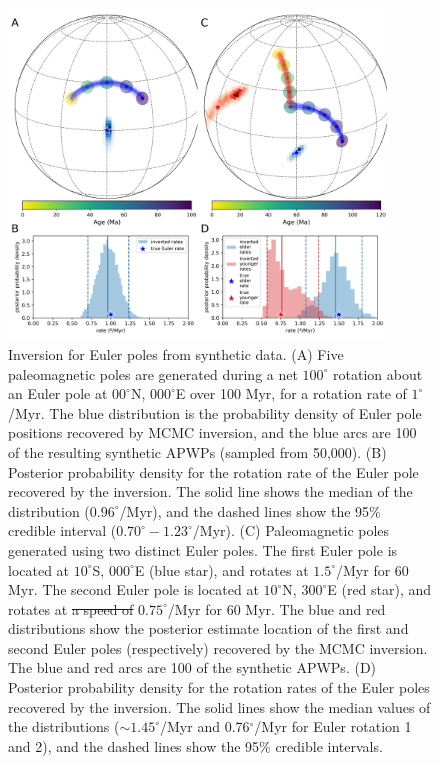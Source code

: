 \documentclass[11pt,letterpaper]{article}
\providecommand{\DIFdeltex}[1]{{\protect\color{red}\sout{#1}}}                      %
\providecommand{\DIFdelFL}[1]{\DIFdel{#1}} %
\providecommand{\DIFdelbeginFL}{} %
\providecommand{\DIFdelendFL}{} %
\providecommand{\DIFdel}[1]{\texorpdfstring{\DIFdeltex{#1}}{}} %
\newcommand{\DIFscaledelfig}{0.5}
\newlength{\DIFdelgraphicswidth} %
\newlength{\DIFdelgraphicsheight} %
\newcommand{\DIFdelincludegraphics}[2][]{%
\sbox{\DIFdelgraphicsbox}{\DIFOincludegraphics[#1]{#2}}%
\settoboxwidth{\DIFdelgraphicswidth}{\DIFdelgraphicsbox} %
\settoboxtotalheight{\DIFdelgraphicsheight}{\DIFdelgraphicsbox} %
\scalebox{\DIFscaledelfig}{%
\parbox[b]{\DIFdelgraphicswidth}{\usebox{\DIFdelgraphicsbox}\\[-\baselineskip] \rule{\DIFdelgraphicswidth}{0em}}\llap{\resizebox{\DIFdelgraphicswidth}{\DIFdelgraphicsheight}{%
\setlength{\unitlength}{\DIFdelgraphicswidth}%
\begin{picture}(1,1)%
\thicklines\linethickness{2pt} %
{\color[rgb]{1,0,0}\put(0,0){\framebox(1,1){}}}%
{\color[rgb]{1,0,0}\put(0,0){\line( 1,1){1}}}%
{\color[rgb]{1,0,0}\put(0,1){\line(1,-1){1}}}%
\end{picture}%
}\hspace*{3pt}}} %
} %
\DeclareRobustCommand{\DIFdelbeginFL}{\DIFOdelbeginFL \let\includegraphics\DIFdelincludegraphics} %
\DeclareRobustCommand{\DIFdelendFL}{\DIFOaddendFL \let\includegraphics\DIFOincludegraphics} %
\begin{document}
\begin{figure}
\centering
\includegraphics[width=0.9\textwidth]{fig_synthetic_pep.png}
\caption{Inversion for Euler poles from synthetic data. (A) Five paleomagnetic poles are generated during a net $100^\circ$ rotation about an Euler pole at $00^\circ$N, $000^\circ$E over 100 Myr, for a rotation rate of $1^\circ$/Myr. The blue distribution is the probability density of Euler pole positions recovered by MCMC inversion, and the blue arcs are 100 of the resulting synthetic APWPs (sampled from 50,000). (B) Posterior probability density for the rotation rate of the Euler pole recovered by the inversion. The solid line shows the median of the distribution ($0.96^\circ$/Myr), and the dashed lines show the 95\% credible interval ($0.70^\circ-1.23^\circ$/Myr). (C) Paleomagnetic poles generated using two distinct Euler poles. The first Euler pole is located at $10^\circ$S, $000^\circ$E (blue star), and rotates at $1.5^\circ$/Myr for 60 Myr. The second Euler pole is located at $10^\circ$N, $300^\circ$E (red star), and rotates at \DIFdelbeginFL \DIFdelFL{a speed of }\DIFdelendFL $0.75^\circ$/Myr for 60 Myr. The blue and red distributions show the posterior estimate location of the first and second Euler poles (respectively) recovered by the MCMC inversion. The blue and red arcs are 100 of the synthetic APWPs. (D) Posterior probability density for the rotation rates of the Euler poles recovered by the inversion. The solid lines show the median values of the distributions ($\sim 1.45^\circ$/Myr and 0.76$^\circ$/Myr for Euler rotation 1 and 2), and the dashed lines show the 95\% credible intervals.}
\label{fig:synthetic_pep}
\end{figure}
\end{document}
